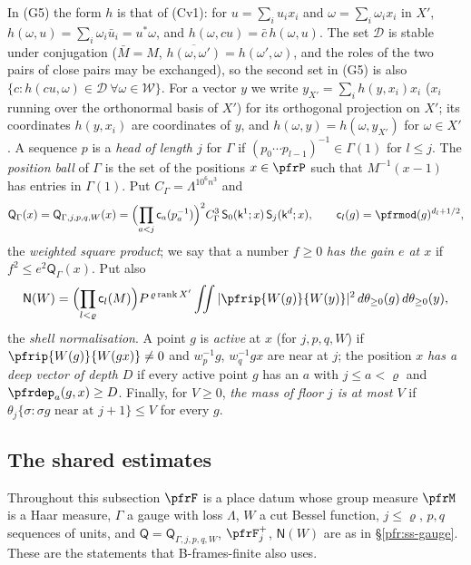 \documentclass[10pt]{amsart}
\theoremstyle{definition}
\theoremstyle{remark}
\begin{document}
In (G5) the form $h$ is that of (Cv1): for $u=\sum_iu_ix_i$ and $\omega=\sum_i\omega_ix_i$ in $X'$,
$h(\omega,u)=\sum_i\omega_i\bar u_i=u^*\omega$, and $h(\omega,cu)=\bar c\,h(\omega,u)$. The set $\mathcal D$ is stable
under conjugation ($\bar M=M$, $\overline{h(\omega,\omega')}=h(\omega',\omega)$, and the roles of the two pairs of close
pairs may be exchanged), so the second set in (G5) is also $\{c:h(cu,\omega)\in\mathcal D\ \forall\omega\in\mathcal W\}$.
For a vector $y$ we write $y_{X'}=\sum_ih(y,x_i)x_i$ ($x_i$ running over the orthonormal basis of $X'$) for its
orthogonal projection on $X'$; its coordinates $h(y,x_i)$ are coordinates of $y$, and $h(\omega,y)=h(\omega,y_{X'})$
for $\omega\in X'$.
A sequence $p$ is a \emph{head of length $j$} for $\Gamma$ if $(p_0\cdots p_{l-1})^{-1}\in\Gamma(1)$ for
$l\le j$. The \emph{position ball} of $\Gamma$ is the set of the positions $x\in\pfrP$ such that
$M^{-1}(x-1)$ has entries in $\Gamma(1)$. Put $C_\Gamma=\Lambda^{10^6n^3}$ and
\[
\mathsf Q_\Gamma(x)=\mathsf Q_{\Gamma,j,p,q,W}(x)=\Bigl(\prod_{a<j}\mathsf c_a(p_a^{-1})\Bigr)^2C_\Gamma^3\,
\mathsf S_0(\mathsf k^1;x)\,\mathsf S_j(\mathsf k^{d};x),\qquad\mathsf c_l(g)=\pfrmod(g)^{d_l+1/2},
\]
the \emph{weighted square product}; we say that a number $f\ge0$ \emph{has the gain $e$ at $x$} if
$f^2\le e^2\mathsf Q_\Gamma(x)$. Put also
\[
\mathsf N(W)=\Bigl(\prod_{l<\varrho}\mathsf c_l(M)\Bigr)P^{\,\varrho\operatorname{rank}X'}\iint
|\pfrip{W(g)}{W(y)}|^2\,d\theta_{\ge0}(g)\,d\theta_{\ge0}(y),
\]
the \emph{shell normalisation}. A point $g$ is \emph{active} at $x$ (for $j,p,q,W$) if
$\pfrip{W(g)}{W(gx)}\ne0$ and $w_p^{-1}g$, $w_q^{-1}gx$ are near at $j$; the position $x$ \emph{has a
deep vector of depth $D$} if every active point $g$ has an $a$ with $j\le a<\varrho$ and
$\pfrdep_a(g,x)\ge D$. Finally, for $V\ge0$, \emph{the mass of floor $j$ is at most $V$} if
$\theta_j\{\sigma:\sigma g\text{ near at }j+1\}\le V$ for every $g$.

\subsection{The shared estimates}\label{pfr:ss-shared}

Throughout this subsection $\pfrF$ is a place datum whose group measure $\pfrM$ is a Haar measure,
$\Gamma$ a gauge with loss $\Lambda$, $W$ a cut Bessel function, $j\le\varrho$, $p,q$ sequences of units,
and $\mathsf Q=\mathsf Q_{\Gamma,j,p,q,W}$, $\pfrF^+_j$, $\mathsf N(W)$ are as in \S\ref{pfr:ss-gauge}.
These are the statements that \textup{B-frames-finite} also uses.
\end{document}
